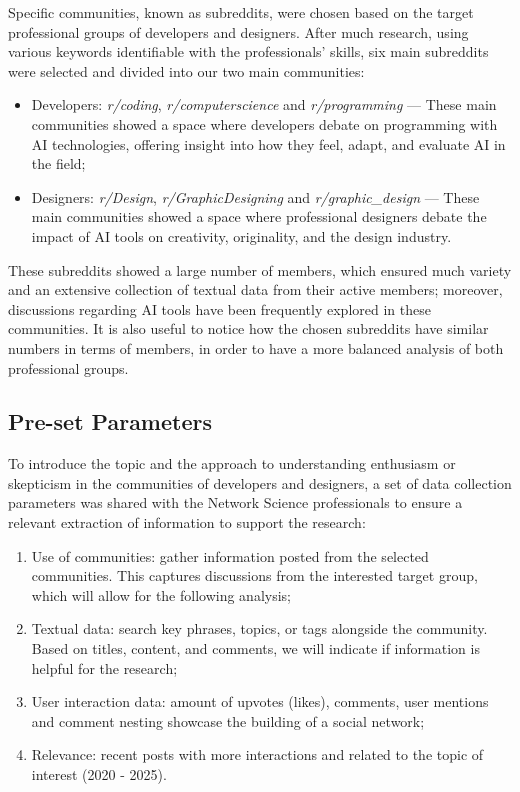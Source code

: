 \documentclass[conference]{IEEEtran}
\begin{document}
Specific communities, known as subreddits, were chosen based on the target professional groups of developers and designers. After much research, using various keywords identifiable with the professionals’ skills, six main subreddits were selected and divided into our two main communities:

\begin{itemize}
    \item Developers: \textit{r/coding}, \textit{r/computerscience} and \textit{r/programming} — These main communities showed a space where developers debate on programming with AI technologies, offering insight into how they feel, adapt, and evaluate AI in the field;
    \item Designers: \textit{r/Design}, \textit{r/GraphicDesigning} and \textit{r/graphic\_design} — These main communities showed a space where professional designers debate the impact of AI tools on creativity, originality, and the design industry.
\end{itemize}

These subreddits showed a large number of members, which ensured much variety and an extensive collection of textual data from their active members; moreover, discussions regarding AI tools have been frequently explored in these communities. It is also useful to notice how the chosen subreddits have similar numbers in terms of members, in order to have a more balanced analysis of both professional groups.

\subsection{Pre-set Parameters}

To introduce the topic and the approach to understanding enthusiasm or skepticism in the communities of developers and designers, a set of data collection parameters was shared with the Network Science professionals to ensure a relevant extraction of information to support the research:

\begin{enumerate}[label= (\alph*)]
    \item Use of communities: gather information posted from the selected communities. This captures discussions from the interested target group, which will allow for the following analysis;
    \item Textual data: search key phrases, topics, or tags alongside the community. Based on titles, content, and comments, we will indicate if information is helpful for the research;
    \item User interaction data: amount of upvotes (likes), comments, user mentions and comment nesting showcase the building of a social network;
    \item Relevance: recent posts with more interactions and related to the topic of interest (2020 - 2025).
\end{enumerate}
\end{document}
